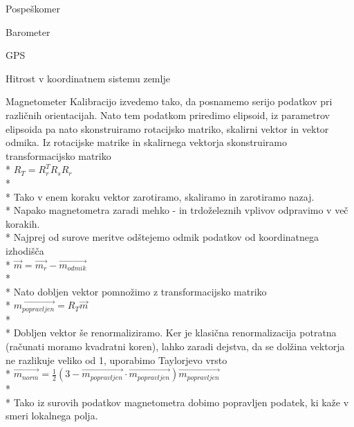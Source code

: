 \documentclass[]{article}
\begin{document}
\begin {subsection}{Pospeškomer}
\begin {subsection}{Barometer}
\begin {subsection}{GPS}
\begin {subsection}{Hitrost v koordinatnem sistemu zemlje}
\begin {subsection}{Magnetometer}
Kalibracijo izvedemo tako, da posnamemo serijo podatkov pri različnih orientacijah. Nato tem podatkom priredimo elipsoid, iz parametrov elipsoida pa nato skonstruiramo rotacijsko matriko, skalirni vektor in vektor odmika.
Iz rotacijske matrike in skalirnega vektorja skonstruiramo transformacijsko matriko\\*
$ R_{T} = R^{T}_{r}  R_{s}  R_{r} $\\*\\*
Tako v enem koraku vektor zarotiramo, skaliramo in zarotiramo nazaj.\\*
Napako magnetometra zaradi mehko - in trdoželeznih vplivov odpravimo v več korakih.\\*
Najprej od surove meritve odštejemo odmik podatkov od koordinatnega izhodišča\\*
$ \vec{m} = \vec{m_{r}} - \vec{m_{odmik}}  $\\*\\*
Nato dobljen vektor pomnožimo z transformacijsko matriko\\*
$ \vec{m_{popravljen}} = R_{T} \vec{m} $\\*\\*
Dobljen vektor še renormaliziramo. Ker je klasična renormalizacija potratna (računati moramo kvadratni koren), lahko zaradi dejstva, da se dolžina vektorja ne razlikuje veliko od 1, uporabimo Taylorjevo vrsto\\*
$ \vec{m_{norm}} = \frac{1}{2}(3 - \vec{m_{popravljen}} \cdot \vec{m_{popravljen}} )\vec{m_{popravljen}} $\\*\\*
Tako iz surovih podatkov magnetometra dobimo popravljen podatek, ki kaže v smeri lokalnega polja.

\end {subsection}

\end{subsection}
\end{subsection}
\end{subsection}
\end{subsection}
\end{document}
